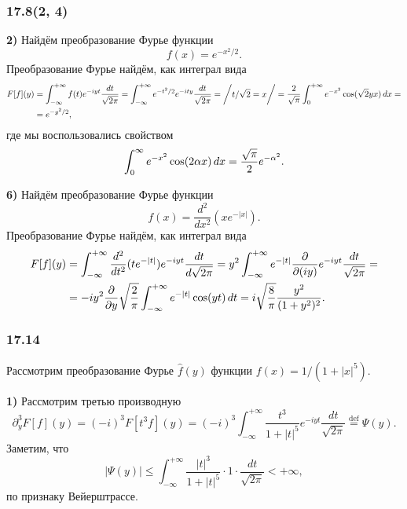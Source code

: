 \subsubsection*{17.8(2, 4)}

\textbf{2)} Найдём преобразование Фурье функции
\begin{equation*}
    f(x) = e^{-x^2/2}.
\end{equation*}
Преобразование Фурье найдём, как интеграл вида
\begin{align*}
    F[f](y) &= \int_{-\infty}^{+\infty} f(t) e^{-i y t} \frac{d t}{\sqrt{2\pi}}  =
    \int_{-\infty}^{+\infty} e^{-t^2/2} e^{-ity} \frac{d t}{\sqrt{2\pi}} = 
    \bigg/
        \begin{aligned}
            t/\sqrt{2} = x
        \end{aligned}
    \bigg/ = \frac{2}{\sqrt{\pi}} \int_0^{+\infty} e^{-x^2} \cos(\sqrt{2} y x) \, d x = \\
    &=
    e^{-y^2/2},
\end{align*}
где мы воспользовались свойством
\begin{equation*}
    \int_0^{\infty} e^{-x^2} \cos (2 \alpha x) \, d x = \frac{\sqrt{\pi}}{2} e^{-\alpha^2}.
\end{equation*}

\textbf{6)} Найдём преобразование Фурье функции
\begin{equation*}
    f(x) = \frac{d^2 }{d x^2} (x e^{-|x|}).
\end{equation*}
Преобразование Фурье найдём, как интеграл вида
\begin{align*}
    F[f](y) 
    &= 
    \int_{-\infty}^{+\infty} 
    \frac{d^2 }{d t^2} (t e^{-|t|}) e^{-iyt} \frac{d t}{d \sqrt{2\pi}} 
    = 
    y^2 \int_{-\infty}^{+\infty} 
    e^{-|t|} \frac{\partial }{\partial (iy)} e^{-iyt}
    \frac{dt}{\sqrt{2\pi}}
    = \\ &=
    - i y^2 \frac{\partial }{\partial y}  \sqrt{\frac{2}{\pi}} \int_{-\infty}^{+\infty} 
    e^{-|t|} \cos (yt)
    \, d t
    = 
    i \sqrt{\frac{8}{\pi}} \frac{y^2}{(1+y^2)^2}.
\end{align*}
 

\subsubsection*{17.14}

Рассмотрим преобразование Фурье $\hat{f} (y)$ функции $f(x) = 1/(1+|x|^5)$. 

 \textbf{1)} Рассмотрим третью производную
 \begin{equation*}
     \partial^3_y F[f](y) = (-i)^3 F[t^3 f] (y) = 
     (-i)^3 \int_{-\infty}^{+\infty} 
      \frac{t^3}{1 + |t|^5} e^{-iyt} 
      \frac{dt}{\sqrt{2\pi}}
      \overset{\mathrm{def}}{=} \Psi(y).
 \end{equation*}
 Заметим, что
 \begin{equation*}
     |\Psi(y)| \leq \int_{-\infty}^{+\infty} 
    \frac{|t|^3}{1 + |t|^5} \cdot 1 \cdot
     \frac{dt}{\sqrt{2\pi}}  < + \infty,
 \end{equation*}
 по признаку Вейерштрассе. 

